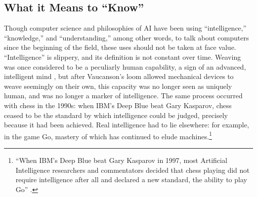 
\subsection{What it Means to ``Know''}

Though computer science and philosophies of AI have been using
``intelligence,'' ``knowledge,'' and ``understanding,'' among other
words, to talk about computers since the beginning of the field, these
uses should not be taken at face value. ``Intelligence'' is slippery,
and its definition is not constant over time. Weaving was once considered to be a
peculiarly human capability, a sign of an advanced, intelligent
mind \cite[p. 627]{riskinDuck}, but after Vaucanson's loom allowed mechanical devices to weave
seemingly on their own, this capacity was no longer seen as uniquely
human, and was no longer a marker of intelligence. The same process
occurred with chess in the 1990s: when IBM's Deep Blue beat Gary
Kasparov, chess ceased to be the standard by which intelligence could
be judged, precisely because it had been achieved. Real intelligence
had to lie elsewhere: for example, in the game Go, mastery of which
has continued to elude machines.\footnote{``When IBM's Deep Blue beat
  Gary Kasparov in 1997, most Artificial Intelligence researchers and
  commentators decided that chess playing did not require intelligence
  after all and declared a new standard, the ability to play Go'' \cite[p. 623]{riskinDuck}.}

